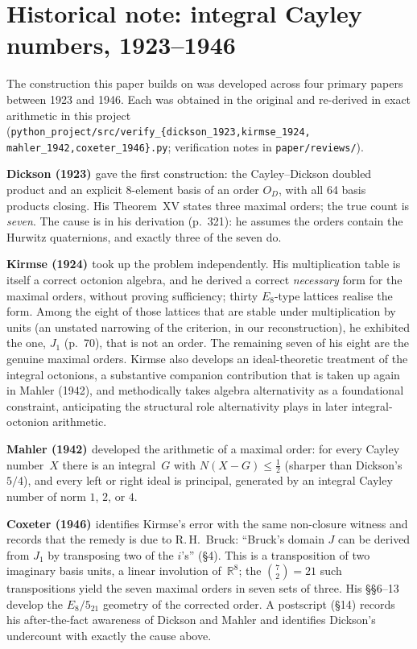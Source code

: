 \documentclass[twoside,english]{paper}
\numberwithin{equation}{section}
\numberwithin{figure}{section}
\theoremstyle{definition}
\theoremstyle{remark}
\newcommand{\RR}{\mathbb{R}}
\newcommand{\Nrm}{N}                  %
\begin{document}
\section{Historical note: integral Cayley numbers,
1923--1946}\label{app:history}

The construction this paper builds on was developed across four
primary papers between 1923 and 1946.  Each was obtained in the
original and re-derived in exact arithmetic in this project
(\texttt{python\_project/src/verify\_\{dickson\_1923,kirmse\_1924,%
mahler\_1942,coxeter\_1946\}.py}; verification notes in
\texttt{paper/reviews/}).

\noindent\textbf{Dickson (1923) \cite{Dickson1923}} gave the first
construction: the Cayley--Dickson doubled product and an explicit
8-element basis of an order $O_D$, with all 64 basis products
closing.  His Theorem~XV states three maximal orders; the true count
is \emph{seven}.  The cause is in his derivation (p.~321): he assumes
the orders contain the Hurwitz quaternions, and exactly three of the
seven do.

\noindent\textbf{Kirmse (1924) \cite{Kirmse1924}} took up the problem
independently.  His multiplication table is itself a correct
octonion algebra, and he derived a correct \emph{necessary} form
for the maximal orders, without proving sufficiency; thirty
$E_8$-type lattices realise the form.  Among the eight of those lattices that
are stable under multiplication by units (an unstated narrowing of
the criterion, in our reconstruction), he exhibited the one,
$J_1$ (p.~70), that is not an order.  The remaining seven of his
eight are the genuine maximal orders.  Kirmse also develops an
ideal-theoretic treatment of the integral octonions, a substantive
companion contribution that is taken up again in Mahler (1942),
and methodically takes algebra alternativity as a foundational
constraint, anticipating the structural role alternativity plays in
later integral-octonion arithmetic.

\noindent\textbf{Mahler (1942) \cite{Mahler1942}} developed the
arithmetic of a maximal order: for every Cayley number~$X$ there is
an integral~$G$ with $\Nrm(X-G)\le\tfrac12$ (sharper than Dickson's
$5/4$), and every left or right ideal is principal, generated by an
integral Cayley number of norm $1$, $2$, or $4$.

\noindent\textbf{Coxeter (1946) \cite{Coxeter1946}} identifies
Kirmse's error with the same non-closure witness and records that
the remedy is due to R.\,H.~Bruck: ``Bruck's domain $J$ can be
derived from $J_1$ by transposing two of the $i$'s'' (\S4).  This is
a transposition of two imaginary basis units, a linear involution
of~$\RR^8$; the $\binom72 = 21$ such transpositions yield the seven
maximal orders in seven sets of three.  His \S\S6--13 develop the
$E_8/5_{21}$ geometry of the corrected order.  A postscript (\S14)
records his after-the-fact awareness of Dickson and Mahler and
identifies Dickson's undercount with exactly the cause above.
\end{document}
